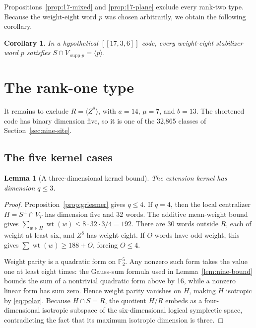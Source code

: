 \documentclass[11pt]{article}
\newtheorem{lemma}[theorem]{Lemma}
\newtheorem{corollary}[theorem]{Corollary}
\theoremstyle{definition}
\theoremstyle{remark}
\newcommand{\F}{\mathbb F_2}
\newcommand{\qc}[1]{[\![#1]\!]}
\newcommand{\wt}{\operatorname{wt}}
\begin{document}
Propositions~\ref{prop:17-mixed} and \ref{prop:17-plane} exclude every
rank-two type. Because the weight-eight word \(p\) was chosen
arbitrarily, we obtain the following corollary.

\begin{corollary}\label{cor:rank-one-everywhere}
In a hypothetical \(\qc{17,3,6}\) code, every weight-eight stabilizer
word \(p\) satisfies \(S\cap V_{\operatorname{supp}p}=\langle p\rangle\).
\end{corollary}

\section{The rank-one type}\label{sec:rank-one}

It remains to exclude \(R=\langle Z^8\rangle\), with \(a=14\),
\(\mu=7\), and \(b=13\). The shortened code has binary dimension five,
so it is one of the 32,865 classes of Section~\ref{sec:nine-site}.

\subsection{The five kernel cases}

\begin{lemma}[A three-dimensional kernel bound]\label{lem:qthree}
The extension kernel has dimension \(q\leq3\).
\end{lemma}
\begin{proof}
Proposition~\ref{prop:griesmer} gives \(q\leq4\). If \(q=4\), then the
local centralizer \(H=S^\perp\cap V_T\) has dimension five and 32 words.
The additive mean-weight bound gives
\(\sum_{w\in H}\wt(w)\leq8\cdot32\cdot3/4=192\). There are 30 words
outside \(R\), each of weight at least six, and \(Z^8\) has weight
eight. If \(O\) words have odd weight, this gives
\(\sum\wt(w)\geq188+O\), forcing \(O\leq4\).

Weight parity is a quadratic form on \(\F^5\). Any nonzero such form
takes the value one at least eight times: the Gauss-sum formula used in
Lemma~\ref{lem:nine-bound} bounds the sum of a nontrivial quadratic form
above by 16, while a nonzero linear form has sum zero. Hence weight
parity vanishes on \(H\), making \(H\) isotropic by \eqref{eq:polar}.
Because \(H\cap S=R\), the quotient \(H/R\) embeds as a four-dimensional
isotropic subspace of the six-dimensional logical symplectic space,
contradicting the fact that its maximum isotropic dimension is three.
\end{proof}
\end{document}
